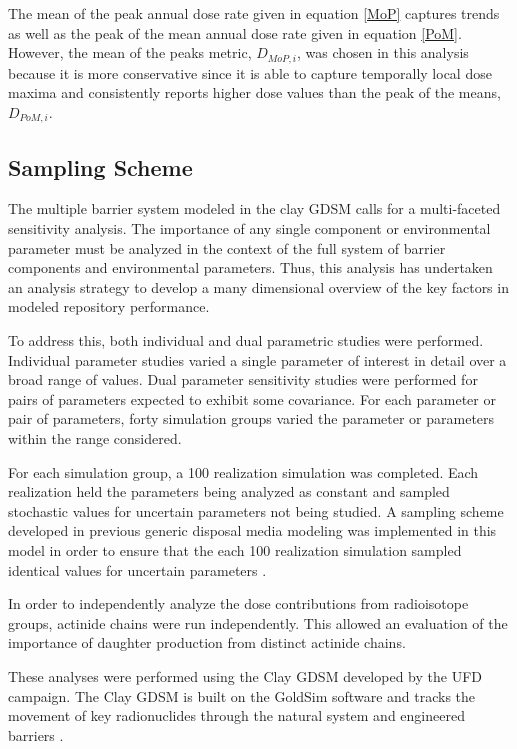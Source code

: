 The mean of the peak annual dose rate given in equation \eqref{MoP} 
captures trends as well as the peak of the mean annual dose rate given 
in equation \eqref{PoM}. However, the mean of the peaks metric, $D_{MoP,i}$, was 
chosen in this analysis because it is more conservative since it is able to 
capture temporally local dose maxima and consistently reports higher dose values 
than the peak of the means, $D_{PoM,i} $.

\subsection{Sampling Scheme}

The multiple barrier system modeled in the clay \gls{GDSM} calls for a 
multi-faceted sensitivity analysis. The importance of any single component or 
environmental parameter must be analyzed in the context of the full system of 
barrier components and environmental parameters. Thus, this analysis has 
undertaken an analysis strategy to develop a many dimensional overview of the 
key factors in modeled repository performance. 

To address this, both individual and dual parametric studies were performed. 
Individual parameter studies varied a single parameter of interest in 
detail over a broad range of values. Dual parameter sensitivity studies were 
performed for pairs of parameters expected to exhibit some covariance. For 
each parameter or pair of parameters, forty simulation 
groups varied the parameter or parameters within the range considered. 

For each simulation group, a 100 realization simulation was completed. Each
realization held the parameters being analyzed as constant and sampled 
stochastic values for uncertain parameters not being studied.  A sampling scheme 
developed in previous generic disposal media modeling was implemented in this 
model in order to ensure that the each 100 realization simulation sampled 
identical values for uncertain parameters \cite{clayton_generic_2011, 
nutt_generic_2009}.  

In order to independently analyze the dose contributions from radioisotope 
groups, actinide chains were run independently. This allowed an evaluation of 
the importance of daughter production from distinct actinide chains.

These analyses were performed using the Clay \gls{GDSM} developed by the 
\gls{UFD} campaign\cite{clayton_generic_2011}. The Clay \gls{GDSM} is built on the 
GoldSim software and tracks the movement of key radionuclides through the 
natural system and engineered barriers \cite{golder_goldsim_2010, 
golder_goldsim_ct_2010}.

